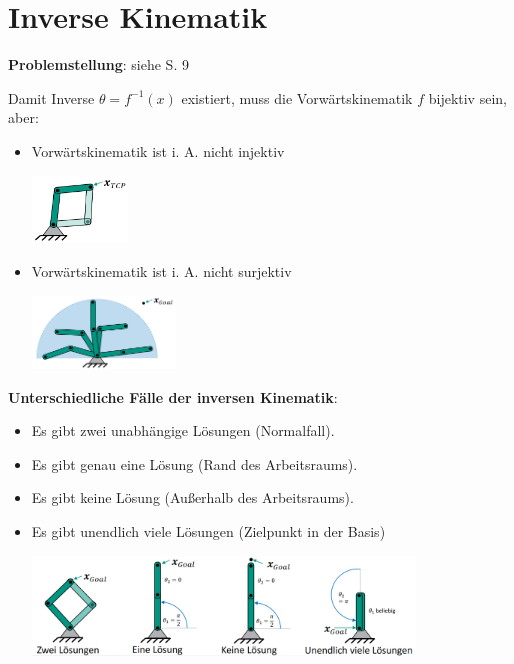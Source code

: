 \section{Inverse Kinematik}

\textbf{Problemstellung}: siehe S. 9

Damit Inverse $\theta=f^{-1}(x)$ existiert, muss die Vorwärtskinematik $f$ bijektiv sein, aber:\\
\begin{itemize}
	\item Vorwärtskinematik ist i. A. nicht injektiv
	\begin{center}
		\includegraphics[width=0.2\textwidth]{images/inj.png}
	\end{center}
	\item Vorwärtskinematik ist i. A. nicht surjektiv
	\begin{center}
		\includegraphics[width=0.3\textwidth]{images/sur.png}
	\end{center}
\end{itemize}
\bigskip
\textbf{Unterschiedliche Fälle der inversen Kinematik}:
\begin{itemize}
	\item Es gibt zwei unabhängige Lösungen (Normalfall).
	\item Es gibt genau eine Lösung (Rand des Arbeitsraums).
	\item Es gibt keine Lösung (Außerhalb des Arbeitsraums).
	\item Es gibt unendlich viele Lösungen (Zielpunkt in der Basis)
	\begin{center}
		\includegraphics[width=0.8\textwidth]{images/inv-fälle.png}
	\end{center}
\end{itemize}
